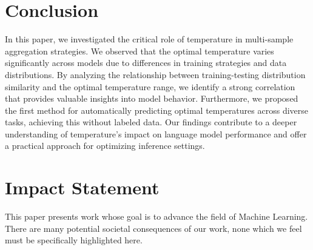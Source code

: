 \section{Conclusion}
In this paper, we investigated the critical role of temperature in multi-sample aggregation strategies. We observed that the optimal temperature varies significantly across models due to differences in training strategies and data distributions. By analyzing the relationship between training-testing distribution similarity and the optimal temperature range, we identify a strong correlation that provides valuable insights into model behavior. Furthermore, we proposed the first method for automatically predicting optimal temperatures across diverse tasks, achieving this without labeled data. Our findings contribute to a deeper understanding of temperature's impact on language model performance and offer a practical approach for optimizing inference settings.

\section*{Impact Statement}
This paper presents work whose goal is to advance the field of Machine Learning. There are many potential societal consequences of our work, none which we feel must be specifically highlighted here.